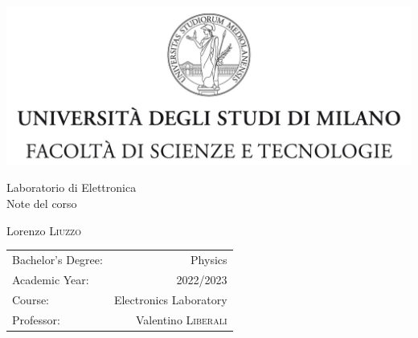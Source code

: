 \documentclass[
	a4paper, %
	10pt, %
]{report}
\begin{document}

\begin{titlepage}
	\begin{center}

		\vspace{1.5cm} %

		\includegraphics[width=1\textwidth]{figures/unimi.jpg} %

		\vspace{1.5cm} %
		
		\Huge Laboratorio di Elettronica \\ Note del corso %
		
		\vspace{1cm} %
		
		\Large Lorenzo \textsc{Liuzzo} %
		
		\vspace{2cm} %

		\begin{tabular}{l r}
			Bachelor's Degree: & Physics \\ %
			Academic Year: & 2022/2023 \\ %
			Course: & Electronics Laboratory \\ %
			Professor: & Valentino \textsc{Liberali} \\%
		\end{tabular}

		\vfill %
	
	\end{center}
\end{titlepage}
\end{document}
